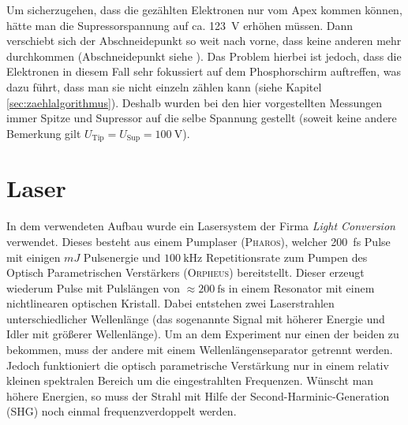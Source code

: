 \documentclass[bachelor,       %
               twoside,        %
               BCOR10mm,       %
               english,ngerman, %
               ]{GAUBM}
\begin{document}
Um sicherzugehen, dass die gezählten Elektronen nur vom Apex kommen können, hätte man die Supressorspannung auf ca. \SI{123}{\V} erhöhen müssen.
Dann verschiebt sich der Abschneidepunkt so weit nach vorne, dass keine anderen mehr durchkommen (Abschneidepunkt siehe \citet[S. 71 ff.]{bormann_2015}).
Das Problem hierbei ist jedoch, dass die Elektronen in diesem Fall sehr fokussiert auf dem Phosphorschirm auftreffen, was dazu führt, dass man sie nicht einzeln zählen kann (siehe Kapitel \ref{sec:zaehlalgorithmus}).
Deshalb wurden bei den hier vorgestellten Messungen immer Spitze und Supressor auf die selbe Spannung gestellt (soweit keine andere Bemerkung gilt $U_\text{Tip}=U_\text{Sup}=\SI{100}{\V}$).







\section{Laser}
In dem verwendeten Aufbau wurde ein Lasersystem der Firma \textit{Light Conversion} verwendet.
Dieses besteht aus einem Pumplaser (\textsc{Pharos}), welcher \SI{200}{\fs} Pulse mit einigen $\unit{mJ}$ Pulsenergie und $\SI{100}{\kilo\hertz}$ Repetitionsrate zum Pumpen des Optisch Parametrischen Verstärkers (\textsc{Orpheus}) bereitstellt.
Dieser erzeugt wiederum Pulse mit Pulslängen von $\approx \SI{200}{\fs}$ in einem Resonator mit einem nichtlinearen optischen Kristall\cite{orpheus_tuningcurve}.
Dabei entstehen zwei Laserstrahlen unterschiedlicher Wellenlänge (das sogenannte Signal mit höherer Energie und Idler mit größerer Wellenlänge).
Um an dem Experiment nur einen der beiden zu bekommen, muss der andere mit einem Wellenlängenseparator getrennt werden.
Jedoch funktioniert die optisch parametrische Verstärkung nur in einem relativ kleinen spektralen Bereich um die eingestrahlten Frequenzen.
Wünscht man höhere Energien, so muss der Strahl mit Hilfe der Second-Harminic-Generation (SHG) noch einmal frequenzverdoppelt werden.\\\\
\end{document}
